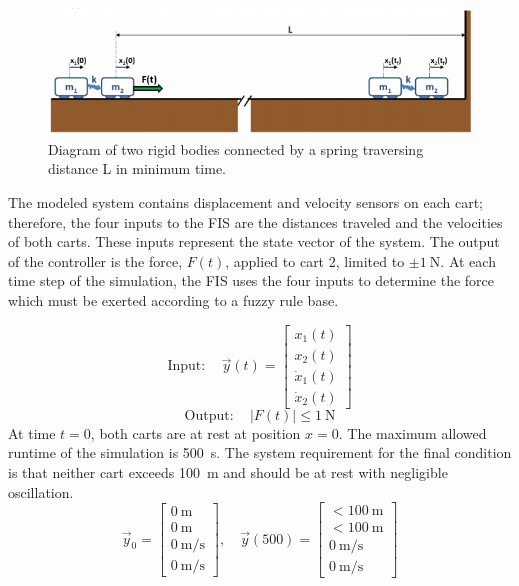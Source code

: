 \begin{figure}
    \includegraphics{images/model.png} \caption{Diagram of two rigid bodies connected by a spring
traversing distance \textrm{L} in minimum time.} \label{f:model}
\end{figure}

The modeled system contains displacement and velocity sensors on each cart; therefore, the four inputs to the
FIS are the distances traveled and the velocities of both carts. These inputs represent the state vector of
the system. The output of the controller is the force, $F(t)$, applied to cart 2, limited to $\pm
\SI{1}{\newton}$. At each time step of the simulation, the FIS uses the four inputs to determine the force
which must be exerted according to a fuzzy rule base. 

\begin{displaymath}
    \mathrm{Input:}\quad \vec{y}(t)= \begin{bmatrix} x_{1}(t)\\ x_{2}(t)\\ \dot{x}_{1}(t)\\
\dot{x}_{2}(t) \end{bmatrix}
\end{displaymath}
\begin{displaymath} \mathrm{Output:}\quad |F(t)|\le
\SI{1}{\newton}
\end{displaymath}
At time $t=0$, both carts are at rest at position
$x=0$. The maximum allowed runtime of the simulation is \SI{500}{\second}. The system requirement for the
final condition is that neither cart exceeds \SI{100}{\metre} and should be at rest with negligible
oscillation. 
\begin{displaymath} \vec{y}_0=\begin{bmatrix}
\SI{0}{\metre}\\\SI{0}{\metre}\\\SI{0}{\metre\per\second}\\\SI{0}{\metre\per\second} \end{bmatrix},\quad
\vec{y}(500)=\begin{bmatrix} <\SI{100}{\metre}\\ <\SI{100}{\metre}\\ \SI{0}{\metre\per\second}\\
\SI{0}{\metre\per\second} \end{bmatrix}
\end{displaymath}

